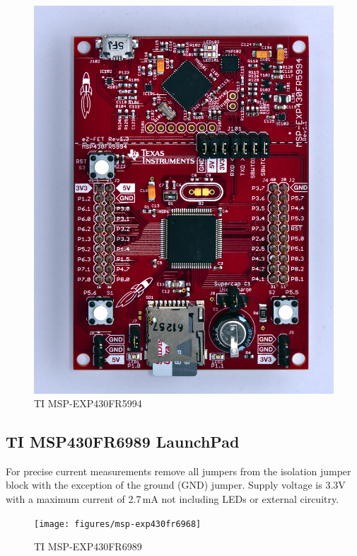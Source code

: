 \documentclass[twoside,11pt]{cergdoc}
\begin{document}
\begin{figure}[ht]
  \begin{center}
    \includegraphics[scale=0.6]{figures/msp-exp430fr5994}
    \caption{TI MSP-EXP430FR5994}\label{fig:5994}
  \end{center}
\vspace{-1ex}
\end{figure}

\subsection{TI MSP430FR6989 LaunchPad\texttrademark}

For precise current measurements remove all jumpers from the isolation jumper block 
with the exception of the ground (GND) jumper. Supply voltage is 3.3V with a maximum 
current of 2.7\,mA not including LEDs or external circuitry.

\begin{figure}[ht]
  \begin{center}
    \texttt{[image: figures/msp-exp430fr6968]}
    \caption{TI MSP-EXP430FR6989}\label{fig:6989}
  \end{center}
\vspace{-1ex}
\end{figure}
\end{document}
